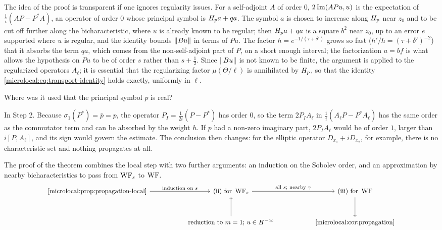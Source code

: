 \begin{remark}\label{microlocal:rem:commutator}
  The idea of the proof is transparent if one ignores regularity issues.
  For a self-adjoint $A$ of order $0$, $2\operatorname{Im}( APu, u)$ is the
  expectation of $\frac1i(AP-P^*A)$, an operator of order $0$ whose principal
  symbol is $H_{p}a+qa$. The symbol $a$ is chosen to increase along $H_{p}$
  near $z_0$ and to be cut off further along the bicharacteristic, where $u$
  is already known to be regular; then $H_{p}a+qa$ is a square $b^2$ near
  $z_0$, up to an error $e$ supported where $u$ is regular, and the identity
  bounds $\lVert Bu\rVert$ in terms of $Pu$. The factor $h=e^{-1/(\tau+\delta')}$ grows so
  fast ($h'/h=(\tau+\delta')^{-2}$) that it absorbs the term $qa$, which comes from
  the non-self-adjoint part of $P$, on a short enough interval; the
  factorization $a=bf$ is what allows the hypothesis on $Pu$ to be of order
  $s$ rather than $s+\frac12$. Since $\lVert Bu\rVert$ is not known to be finite, the
  argument is applied to the regularized operators $A_\ell$; it is essential
  that the regularizing factor $\mu(\Theta/\ell)$ is annihilated by $H_{p}$, so
  that the identity \eqref{microlocal:eq:transport-identity} holds exactly,
  uniformly in $\ell$.
\end{remark}

\begin{question}
  Where was it used that the principal symbol $p$ is real?
\end{question}
\begin{answer}
  In Step 2. Because $\sigma_1(P^*)=\bar p=p$, the operator
  $P_I=\frac1{2i}(P-P^*)$ has order $0$, so the term $2P_IA_\ell$ in
  $\frac1i(A_\ell P-P^*A_\ell)$ has the same order as the commutator term and
  can be absorbed by the weight $h$. If $p$ had a non-zero imaginary part,
  $2P_IA_\ell$ would be of order $1$, larger than $i[P,A_\ell]$, and its sign
  would govern the estimate. The conclusion then changes: for the elliptic
  operator $D_{x_1}+iD_{x_2}$, for example, there is no characteristic set
  and nothing propagates at all.
\end{answer}

The proof of the theorem combines the local step with two further
arguments: an induction on the Sobolev order, and an approximation by nearby
bicharacteristics to pass from $\operatorname{WF}_s$ to $\operatorname{WF}$.
\begin{equation*}
\begin{tikzcd}[column sep=5em,row sep=large,cells={nodes={font=\small}}]
  \text{\cref{microlocal:prop:propagation-local}}
    \arrow[r,"\text{induction on }s"]
  & \text{(ii) for }\WF_s
    \arrow[r,"\text{all }s\text{; nearby }\gamma"]
  & \text{(iii) for }\WF\arrow[d]\\
  & \text{reduction to }m=1\text{; }u\in H^{-\infty}\arrow[u]
  & \text{\cref{microlocal:cor:propagation}}
\end{tikzcd}
\end{equation*}

